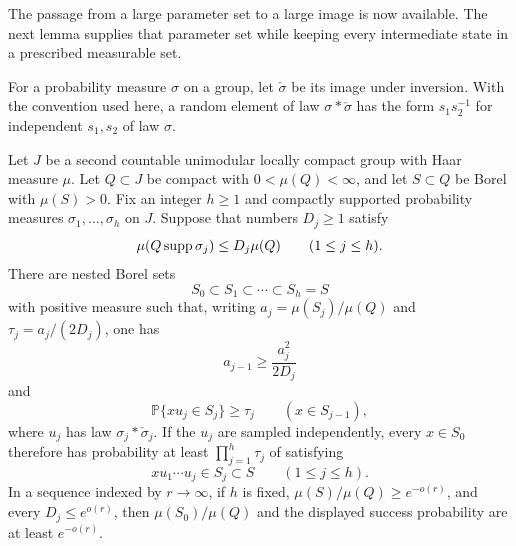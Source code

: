 The passage from a large parameter set to a large image is now
available.  The next lemma supplies that parameter set while keeping
every intermediate state in a prescribed measurable set.

For a probability measure $\sigma$ on a group, let
$\check\sigma$ be its image under inversion.  With the convention
used here, a random element of law $\sigma*\check\sigma$ has the
form $s_1s_2^{-1}$ for independent $s_1,s_2$ of law $\sigma$.

\begin{lemma}
\label{lem:backward-recurrence}
Let $J$ be a second countable unimodular locally compact group with
Haar measure $\mu$.  Let $Q\subset J$ be compact with
$0<\mu(Q)<\infty$, and let $S\subset Q$ be Borel with
$\mu(S)>0$.  Fix an integer $h\ge1$ and compactly supported
probability measures $\sigma_1,\ldots,\sigma_h$ on $J$.
Suppose that numbers $D_j\ge1$ satisfy
\[
 \mu(Q\operatorname{supp}\sigma_j)\le D_j\mu(Q)
       \qquad(1\le j\le h).
\]
There are nested Borel sets
\[
 S_0\subset S_1\subset\cdots\subset S_h=S
\]
with positive measure such that, writing
$a_j=\mu(S_j)/\mu(Q)$ and $\tau_j=a_j/(2D_j)$, one has
\begin{equation}
\label{eq:recurrence-mass}
 a_{j-1}\ge\frac{a_j^2}{2D_j}
\end{equation}
and
\begin{equation}
\label{eq:recurrence-transition}
 \mathbb P\{x u_j\in S_j\}\ge\tau_j
       \qquad(x\in S_{j-1}),
\end{equation}
where $u_j$ has law $\sigma_j*\check\sigma_j$.
If the $u_j$ are sampled independently, every $x\in S_0$ therefore
has probability at least $\prod_{j=1}^h\tau_j$ of satisfying
\[
 x u_1\cdots u_j\in S_j\subset S
       \qquad(1\le j\le h).
\]
In a sequence indexed by $r\to\infty$, if $h$ is fixed,
$\mu(S)/\mu(Q)\ge e^{-o(r)}$, and every $D_j\le e^{o(r)}$,
then $\mu(S_0)/\mu(Q)$ and the displayed success probability
are at least $e^{-o(r)}$.
\end{lemma}

